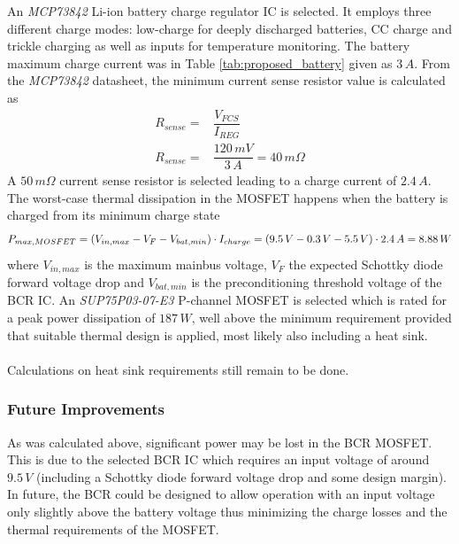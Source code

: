 \noindent
An \textit{MCP73842} Li-ion battery charge regulator \ac{IC} is selected. It employs three different charge modes: low-charge for deeply discharged batteries, \ac{CC} charge and trickle charging as well as inputs for temperature monitoring. The battery maximum charge current was in Table \ref{tab:proposed_battery} given as $3\,A$. From the \textit{MCP73842} datasheet, the minimum current sense resistor value is calculated as
%
\begin{equation}
\begin{split}
R_{sense}=&\dfrac{V_{FCS}}{I_{REG}}\\
R_{sense}=&\dfrac{120\,mV}{3\,A}=40\,m\Omega
\end{split}
\end{equation}
%
A $50\,m \Omega$ current sense resistor is selected leading to a charge current of $2.4\,A$.
%
The worst-case thermal dissipation in the MOSFET happens when the battery is charged from its minimum charge state
%
\begin{equation}
\footnotesize{P_{max,MOSFET}=(V_{in,max}-V_F-V_{bat,min})\cdot I_{charge}=(9.5\,V-0.3\,V-5.5\,V)\cdot 2.4\,A=8.88\,W}
\end{equation}
%
where $V_{in,max}$ is the maximum mainbus voltage, $V_F$ the expected Schottky diode forward voltage drop and $V_{bat,min}$ is the preconditioning threshold voltage of the \ac{BCR} \ac{IC}.
An \textit{SUP75P03-07-E3} P-channel MOSFET is selected which is rated for a peak power dissipation of $187\,W$, well above the minimum requirement provided that suitable thermal design is applied, most likely also including a heat sink. 
\\
\\
Calculations on heat sink requirements still remain to be done.
%
\subsubsection*{Future Improvements}
As was calculated above, significant power may be lost in the \ac{BCR} MOSFET. This is due to the selected \ac{BCR} \ac{IC} which requires an input voltage of around $9.5\,V$ (including a Schottky diode forward voltage drop and some design margin). In future, the \ac{BCR} could be designed to allow operation with an input voltage only slightly above the battery voltage thus minimizing the charge losses and the thermal requirements of the MOSFET.
%
%
